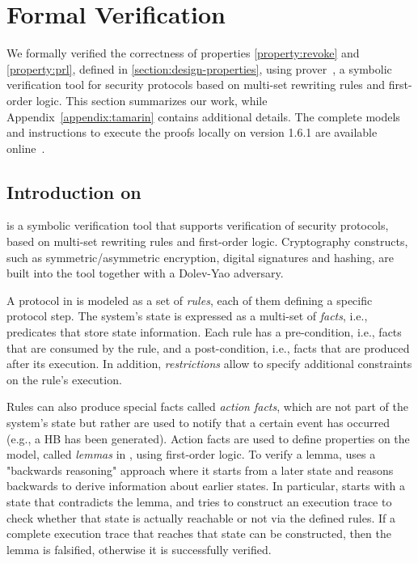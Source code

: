 \section{Formal Verification}
\label{section:design-verification}
%

We formally verified the correctness of properties \ref{property:revoke} and
\ref{property:prl}, defined in \cref{section:design-properties}, using
\tamarin{} prover~\cite{meier2013tamarin}, a symbolic verification tool for
security protocols based on multi-set rewriting rules and first-order logic.
This section summarizes our work, while Appendix~\ref{appendix:tamarin} contains
additional details. The complete models and instructions to
execute the proofs locally on \tamarin{} version 1.6.1 are available
online~\cite{supplMaterial}.

\subsection{Introduction on \tamarin{}}
\label{section:tamarin-intro}

\tamarin{} is a symbolic verification tool that supports verification of
security protocols, based on multi-set rewriting rules and first-order logic.
Cryptography constructs, such as symmetric/asymmetric encryption, digital
signatures and hashing, are built into the tool together with a Dolev-Yao
adversary.

A protocol in \tamarin{} is modeled as a set of \emph{rules}, each of them
defining a specific protocol step. The system's state is expressed as a
multi-set of \emph{facts}, i.e., predicates that store state information. Each
rule has a pre-condition, i.e., facts that are consumed by the rule, and a
post-condition, i.e., facts that are produced after its execution. In addition,
\emph{restrictions} allow to specify additional constraints on the rule's
execution.

Rules can also produce special facts called \emph{action facts}, which are not
part of the system's state but rather are used to notify that a certain event
has occurred (e.g., a \ac{HB} has been generated). Action facts are used to
define properties on the model, called \emph{lemmas} in \tamarin, using
first-order logic. To verify a lemma, \tamarin{} uses a "backwards reasoning"
approach where it starts from a later state and reasons backwards to derive
information about earlier states. In particular, \tamarin{} starts with a state
that contradicts the lemma, and tries to construct an execution trace to check
whether that state is actually reachable or not via the defined rules. If a
complete execution trace that reaches that state can be constructed, then the
lemma is falsified, otherwise it is successfully verified.

